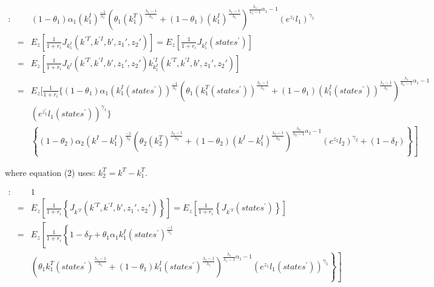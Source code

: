 \documentclass{article}
\begin{document}
\begin{eqnarray}
     [k_1^I]: & &                                                 (1- \theta_1) \alpha_1 (k_{1}^I)^{\frac{-1}{\lambda_1}} \left( \theta_1 (k_{1}^T)^{\frac{\lambda_1-1}{\lambda_1}} +(1-\theta_1)(k_{1}^I)^{\frac{\lambda_1-1}{\lambda_1}} \right)^{\frac{\lambda_1}{\lambda_1-1}\alpha_1-1} \left( e^{z_{1}}l_{1} \right)^{\gamma_1}   \nonumber \\
     & = &  E_z\left[\frac{1}{1+r_i} J_{k_1^I}(k^{\prime T},k^{\prime I},b{\prime},z_{1}{\prime },z_{2}{\prime})   \right] = E_z\left[\frac{1}{1+r_i} J_{k_1^I}(states^\prime)   \right] \nonumber \\
     & = &  E_z\left[\frac{1}{1+r_i} J_{k^I}(k^{\prime T},k^{\prime I},b{\prime},z_{1}{\prime },z_{2}{\prime}) k_{k_1^I}^{\prime I}(k^{\prime T},k^{\prime I},b{\prime},z_{1}{\prime },z_{2}{\prime})  \right] \nonumber \\
     & = &  E_z [ \frac{1}{1+r_i} \{ (1-\theta_1) \alpha_1 (k_{1}^I(states^\prime) )^{\frac{-1}{\lambda_1}}    \left( \theta_1 (k_{1}^T(states^\prime) )^{\frac{\lambda_1-1}{\lambda_1}} +(1-\theta_1)(k_{1}^I(states^\prime) )^{\frac{\lambda_1-1}{\lambda_1}} \right)^{\frac{\lambda_1}{\lambda_1-1}\alpha_1-1} \nonumber \\
     &  &    \left( e^{z_{1}^\prime}l_{1}(states^\prime) \right)^{\gamma_1}  \}   \nonumber \\
     &  &   \left. \left\lbrace (1-\theta_2) \alpha_2 (k^I - k_{1}^I)^{\frac{-1}{\lambda_2}} \left( \theta_2 (k_{2}^T)^{\frac{\lambda_2-1}{\lambda_2}} +(1-\theta_2)(k^I - k_{1}^I)^{\frac{\lambda_2-1}{\lambda_2}} \right)^{\frac{\lambda_2}{\lambda_2-1}\alpha_2-1} \left( e^{z_{2}}l_{2} \right)^{\gamma_2} +(1-\delta_I) \right\rbrace  \right] \quad 
\end{eqnarray}


where equation (2) uses: $ k_2^T = k^T - k_1^T$.

\begin{eqnarray}
     [k^{\prime T}]: & &   1  \nonumber \\
     & = & E_z\left[\frac{1}{1+r_i} \left\lbrace J_{k^{\prime T}}(k^{\prime T},k^{\prime I},b{\prime},z_{1}{\prime },z_{2}{\prime}) \right\rbrace   \right] = E_z\left[\frac{1}{1+r_i} \left\lbrace  J_{k^{\prime T}}(states^\prime) \right\rbrace  \right] \nonumber \\
     & = & E_z\left[ \frac{1}{1+r_i} \left\lbrace 1-\delta_T + \theta_1 \alpha_1 k_{1}^I(states^\prime)^{\frac{-1}{\lambda_1}} \right. \right. \nonumber \\
     &   &  \left. \left. \left( \theta_1 k_{1}^T(states^\prime)^{\frac{\lambda_1-1}{\lambda_1}} +(1-\theta_1)k_{1}^I(states^\prime) ^{\frac{\lambda_1-1}{\lambda_1}} \right)^{\frac{\lambda_1}{\lambda_1-1}\alpha_1-1}  \left( e^{z_{1}} l_1(states^\prime) \right)^{\gamma_1} \right\rbrace  \right] \quad \quad
\end{eqnarray}
\end{document}
